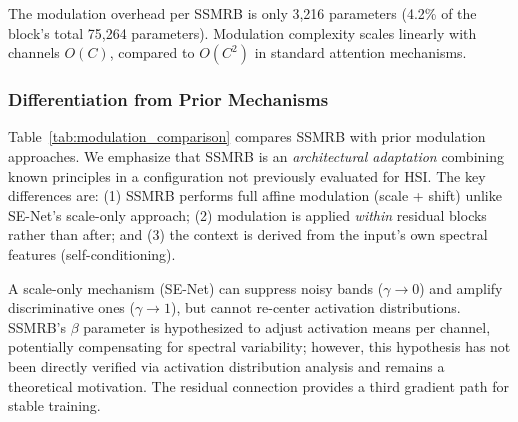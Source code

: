 \documentclass[conference]{IEEEtran}
\begin{document}
{The modulation overhead per SSMRB is only 3,216 parameters (4.2\% of the block's total 75,264 parameters). Modulation complexity scales linearly with channels $O(C)$, compared to $O(C^2)$ in standard attention mechanisms.

\subsubsection{Differentiation from Prior Mechanisms}

Table~\ref{tab:modulation_comparison} compares SSMRB with prior modulation approaches. We emphasize that SSMRB is an \textit{architectural adaptation} combining known principles in a configuration not previously evaluated for HSI. The key differences are: (1) SSMRB performs full affine modulation (scale + shift) unlike SE-Net's scale-only approach; (2) modulation is applied \textit{within} residual blocks rather than after; and (3) the context is derived from the input's own spectral features (self-conditioning).

\begin{table}[!t]
\caption{Comparison with Prior Modulation Mechanisms}
\label{tab:modulation_comparison}
\centering
{}
\end{table}

A scale-only mechanism (SE-Net) can suppress noisy bands ($\gamma \to 0$) and amplify discriminative ones ($\gamma \to 1$), but cannot re-center activation distributions. SSMRB's $\beta$ parameter is hypothesized to adjust activation means per channel, potentially compensating for spectral variability; however, this hypothesis has not been directly verified via activation distribution analysis and remains a theoretical motivation. The residual connection provides a third gradient path for stable training.

}
\end{document}
